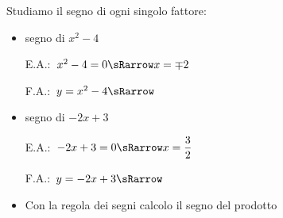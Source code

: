 \begin{esempio}
Studiamo il segno di ogni singolo fattore:
\begin{itemize}
 \item segno di \(x^2-4\)\\
 \begin{minipage}{.35\textwidth}
  E.A.:~\(x^2-4=0 \sRarrow x=\mp 2\)
 \end{minipage}
 \begin{minipage}{.25\textwidth}
  F.A.:~\(y=x^2-4 \sRarrow\)
 \end{minipage}
 \begin{minipage}{.38\textwidth}
  \begin{inaccessibleblock}
\end{inaccessibleblock}
 \end{minipage}
 \item  segno di \(-2x+3\)\\
 \begin{minipage}{.35\textwidth}
  E.A.:~$-2x+3=0 \sRarrow x=\dfrac{3}{2}$
  \vspace{1.8em}
 \end{minipage}
 \begin{minipage}{.25\textwidth}
  F.A.:~$y=-2x+3 \sRarrow $
  \vspace{1.8em}
 \end{minipage}
 \begin{minipage}{.38\textwidth}
  \begin{inaccessibleblock}
\end{inaccessibleblock}
 \end{minipage}
 \item Con la regola dei segni calcolo il segno del prodotto 
\begin{inaccessibleblock}
  \segnoprodotto
\end{inaccessibleblock}
%    
\end{itemize}

\end{esempio}

